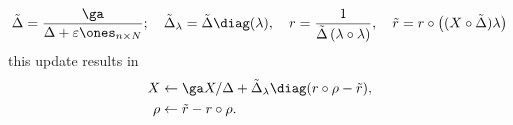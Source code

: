  $$\tilde{\Delta}=\frac{\ga}{\Delta+\varepsilon \ones_{n\times N}};\quad \tilde{\Delta}_\lambda= \tilde{\Delta}\diag(\lambda),\quad r=\frac{1}{\tilde{\Delta}\left(\lambda \circ \lambda\right)}, \quad\tilde{r}=r\circ\left((X\circ\tilde{\Delta})\lambda\right)$$
 this update results in
 \begin{equation}\label{eq:precond}\begin{aligned}
 X &\leftarrow \ga X/\Delta+\tilde{\Delta}_\lambda \diag(r\circ\rho-\tilde{r}),\\
 \rho &\leftarrow \tilde{r}-r\circ\rho.
 \end{aligned}\end{equation}
 	
 	
 
 
